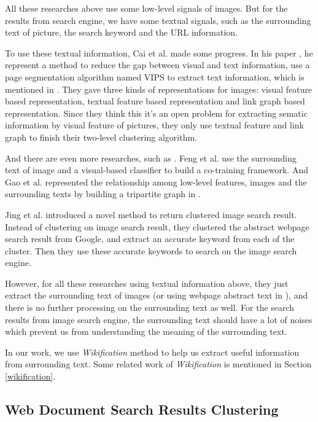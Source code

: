 All these researches above use some low-level signals of images. But for the
results from search engine, we have some textual signals, such as the
surrounding text of picture, the search keyword and the URL information.

To use these textual information, Cai et al. made some progress. In his paper
\cite{Cai2004b,Cai2004}, he represent a method to reduce the gap between
visual and text information, use a page segmentation algorithm named VIPS to
extract text information, which is mentioned in \cite{VIPS}. They gave three
kinds of representations for images: visual feature based representation,
textual feature based representation and link graph based representation. Since
they think this it's an open problem for extracting sematic information by
visual feature of pictures, they only use textual feature and link graph to
finish their two-level clustering algorithm.

And there are even more researches, such as \cite{Feng2004,Gao2005}.
Feng et al. \cite{Feng2004} use the surrounding text of image and a
visual-based classifier to build a co-training framework. And Gao et al.
represented the relationship among low-level features, images and the
surrounding texts by building a tripartite graph in \cite{Gao2005}.

Jing et al. \cite{Jing2006} introduced a novel method to return clustered image
search result. Instead of clustering on image search result, they clustered the
abstract webpage search result from Google, and extract an accurate keyword
from each of the cluster. Then they use these accurate keywords to search on the
image search engine.

However, for all these researches using textual information above, they just
extract the surrounding text of images (or using webpage abstract text in
\cite{Jing2006}), and there is no further processing on the surrounding text as
well. For the search results from image search engine, the surrounding text
should have a lot of noises which prevent us from understanding the meaning of
the surrounding text.

In our work, we use \textit{Wikification} method to help us extract useful
information from surrounding text. Some related work of \textit{Wikification}
is mentioned in Section \ref{wikification}.

\subsection{Web Document Search Results Clustering}

